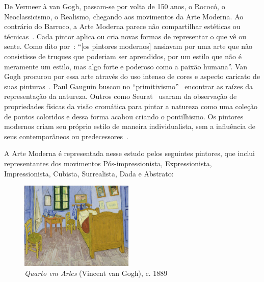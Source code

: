 De Vermeer à van Gogh, passam-se por volta de 150 anos, o Rococó, o
Neoclassicismo, o Realismo, chegando aos movimentos da Arte
Moderna. Ao contrário do Barroco, a Arte Moderna parece não
compartilhar estéticas ou técnicas~\cite{dempsey}. Cada pintor aplica
ou cria novas formas de representar o que vê ou sente. Como dito
por~\citeauthor{gombrich}: ``[os pintores modernos] ansiavam por uma
arte que não consistisse de truques que poderiam ser aprendidos, por
um estilo que não é meramente um estilo, mas algo forte e poderoso
como a paixão humana''. Van Gogh procurou por essa arte através do uso
intenso de cores e aspecto caricato de suas pinturas~\cite{hulsker}.
Paul Gauguin buscou no ``primitivismo''~\cite{lovejoy} encontrar as
raízes da representação da natureza. Outros como Seurat~\cite{kemp}
usaram da observação de propriedades físicas da visão cromática para
pintar a natureza como uma coleção de pontos coloridos e dessa forma
acabou criando o pontilhismo. Os pintores modernos criam seu próprio
estilo de maneira individualista, sem a influência de seus
contemporâneos ou predecessores~\cite{gombrich}.

A Arte Moderna é representada nesse estudo pelos seguintes pintores, que inclui representantes dos movimentos Pós-impressionista, Expressionista, Impressionista, Cubista, Surrealista, Dada e Abstrato:

\begin{figure}
  \begin{center}
    \includegraphics[width=0.48\textwidth]{figs/vangogh_quarto.png}
  \end{center}
  \caption{\emph{Quarto em Arles} (Vincent van Gogh), c. 1889}
  \label{fig:vangogh:quarto}
\end{figure}

